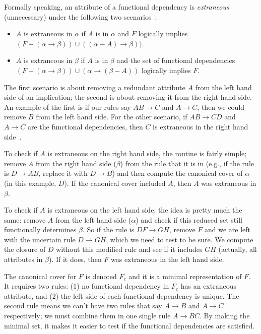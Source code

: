 Formally speaking, an attribute of a functional dependency is \textit{extraneous} (unnecessary) under the following two scenarios~\cite{dsc}:
\begin{itemize}
	\item $A$ is extraneous in $\alpha$ if $A$ is in $\alpha$ and $F$ logically implies $(F - (\alpha \rightarrow \beta)) \cup ((\alpha - A) \rightarrow \beta))$.
	\item $A$ is extraneous in $\beta$ if $A$ is in $\beta$ and the set of functional dependencies $(F - (\alpha \rightarrow \beta)) \cup (\alpha \rightarrow (\beta - A))$ logically implies $F$.
\end{itemize}

The first scenario is about removing a redundant attribute $A$ from the left hand side of an implication; the second is about removing it from the right hand side. An example of the first is if our rules say $AB \rightarrow C$ and $A \rightarrow C$, then we could remove $B$ from the left hand side. For the other scenario, if $AB \rightarrow CD$ and $A \rightarrow C$ are the functional dependencies, then $C$ is extraneous in the right hand side~\cite{dsc}.

To check if $A$ is extraneous on the right hand side, the routine is fairly simple; remove $A$ from the right hand side ($\beta$) from the rule that it is in (e.g., if the rule is $D \rightarrow AB$, replace it with $D \rightarrow B$) and then compute the canonical cover of $\alpha$ (in this example, $D$). If the canonical cover included $A$, then $A$ was extraneous in $\beta$.

To check if $A$ is extraneous on the left hand side, the idea is pretty much the same: remove $A$ from the left hand side ($\alpha$) and check if this reduced set still functionally determines $\beta$. So if the rule is $DF \rightarrow GH$, remove $F$ and we are left with the uncertain rule $D \rightarrow GH$, which we need to test to be sure. We compute the closure of $D$ without this modified rule and see if it includes $GH$ (actually, all attributes in $\beta$). If it does, then $F$ was extraneous in the left hand side.

The canonical cover for $F$ is denoted $F_{c}$ and it is a minimal representation of $F$. It requires two rules: (1) no functional dependency in $F_{c}$ has an extraneous attribute, and (2) the left side of each functional dependency is unique. The second rule means we can't have two rules that say $A \rightarrow B$ and $A \rightarrow C$ respectively; we must combine them in one single rule $A \rightarrow BC$. By making the minimal set, it makes it easier to test if the functional dependencies are satisfied.

